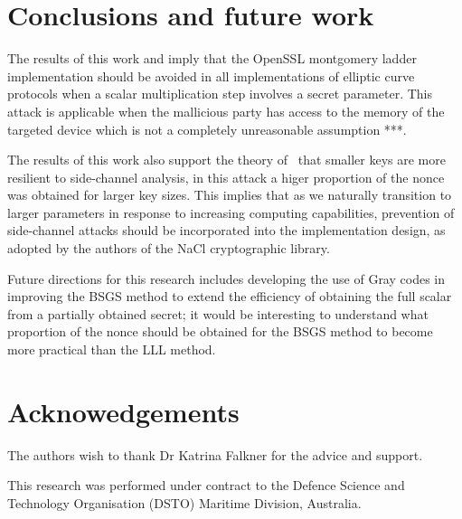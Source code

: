 \documentclass{llncs}
\newcommand{\starpar}[1]{\par{\footnotesize $\star$ \hl{#1}\par}}
\begin{document}
\section{Conclusions and future work}
The results of this work and \cite{remote_attack} imply that the OpenSSL montgomery ladder implementation should be avoided in all implementations of elliptic curve protocols when a scalar multiplication step involves a secret parameter. This attack is applicable when the mallicious party has access to the memory of the targeted device which is not a completely unreasonable assumption ***. 

The results of this work also support the theory of~\cite{walter04longer} that smaller keys are more resilient to side-channel analysis, in this attack a higer proportion of the nonce was obtained for larger key sizes. This implies that as we naturally transition to larger parameters in response to increasing computing capabilities, prevention of side-channel attacks should be incorporated into the implementation design, as adopted by the authors of the NaCl cryptographic library. 

Future directions for this research includes developing the use of Gray codes in improving the BSGS method to extend the efficiency of obtaining the full scalar from a partially obtained secret; it would be interesting to understand what proportion of the nonce should be obtained for the BSGS method to become more practical than the LLL method.

\section{Acknowedgements}
The authors wish to thank Dr Katrina Falkner for the advice and support.

This research was performed under contract to the Defence
Science and Technology Organisation (DSTO) Maritime Division,
Australia.




\end{document}
